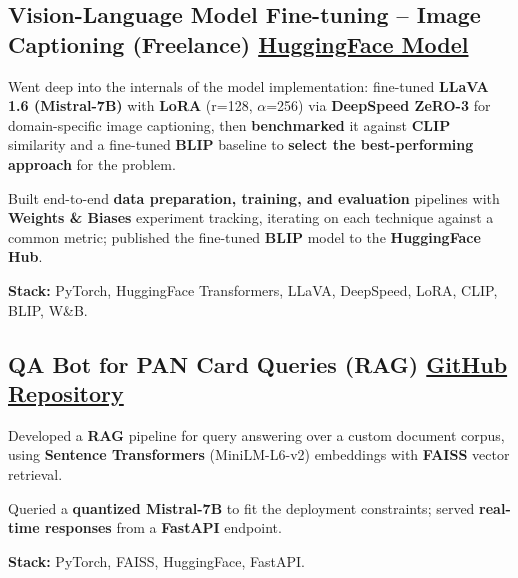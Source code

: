 \documentclass[letter,10pt]{article}
\begin{document}
\subsection{Vision-Language Model Fine-tuning – Image Captioning (Freelance) \hfill \href{https://huggingface.co/sunil448832/blip-model}{HuggingFace Model}}
\begin{zitemize}
\item Went deep into the internals of the model implementation: fine-tuned \textbf{LLaVA 1.6 (Mistral-7B)} with \textbf{LoRA} (r=128, $\alpha$=256) via \textbf{DeepSpeed ZeRO-3} for domain-specific image captioning, then \textbf{benchmarked} it against \textbf{CLIP} similarity and a fine-tuned \textbf{BLIP} baseline to \textbf{select the best-performing approach} for the problem.
\item Built end-to-end \textbf{data preparation, training, and evaluation} pipelines with \textbf{Weights \& Biases} experiment tracking, iterating on each technique against a common metric; published the fine-tuned \textbf{BLIP} model to the \textbf{HuggingFace Hub}.
\item \textbf{Stack:} PyTorch, HuggingFace Transformers, LLaVA, DeepSpeed, LoRA, CLIP, BLIP, W\&B.
\end{zitemize}

\subsection{QA Bot for PAN Card Queries (RAG) \hfill \href{https://github.com/sunil448832/Natural-Language-Processing/tree/master/RAG(Retrieval\%20Augment\%20Generation)}{GitHub Repository}}
\begin{zitemize}
\item Developed a \textbf{RAG} pipeline for query answering over a custom document corpus, using \textbf{Sentence Transformers} (MiniLM-L6-v2) embeddings with \textbf{FAISS} vector retrieval.
\item Queried a \textbf{quantized Mistral-7B} to fit the deployment constraints; served \textbf{real-time responses} from a \textbf{FastAPI} endpoint.
\item \textbf{Stack:} PyTorch, FAISS, HuggingFace, FastAPI.
\end{zitemize}
\end{document}
